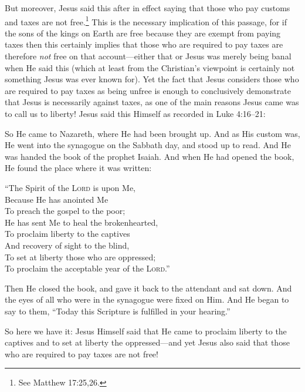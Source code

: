 \documentclass[letterpaper,12pt]{article}
\newenvironment{squotation}
  {\small\quotation}
  {\endquotation\normalsize}
\newenvironment{sverse}
  {\small\verse}
  {\endverse\normalsize}
\begin{document}
But moreover, Jesus said this after in effect saying that those who pay customs and taxes are not free.\footnote{See Matthew 17:25,26.} This is the necessary implication of this passage, for if the sons of the kings on Earth are free because they are exempt from paying taxes then this certainly implies that those who are required to pay taxes are therefore \emph{not} free on that account---either that or Jesus was merely being banal when He said this (which at least from the Christian's viewpoint is certainly not something Jesus was ever known for). Yet the fact that Jesus considers those who are required to pay taxes as being unfree is enough to conclusively demonstrate that Jesus is necessarily against taxes, as one of the main reasons Jesus came was to call us to liberty! Jesus said this Himself as recorded in Luke 4:16--21:

\begin{squotation}
So He came to Nazareth, where He had been brought up. And as His custom was, He went into the synagogue on the Sabbath day, and stood up to read. And He was handed the book of the prophet Isaiah. And when He had opened the book, He found the place where it was written:

\begin{sverse}
``The Spirit of the \textsc{Lord} is upon Me,\\
Because He has anointed Me\\
To preach the gospel to the poor;\\
He has sent Me to heal the brokenhearted,\\
To proclaim liberty to the captives\\
And recovery of sight to the blind,\\
To set at liberty those who are oppressed;\\
To proclaim the acceptable year of the \textsc{Lord}.''
\end{sverse}

Then He closed the book, and gave it back to the attendant and sat down. And the eyes of all who were in the synagogue were fixed on Him. And He began to say to them, ``Today this Scripture is fulfilled in your hearing.''
\end{squotation}

So here we have it: Jesus Himself said that He came to proclaim liberty to the captives and to set at liberty the oppressed---and yet Jesus also said that those who are required to pay taxes are not free!
\end{document}
